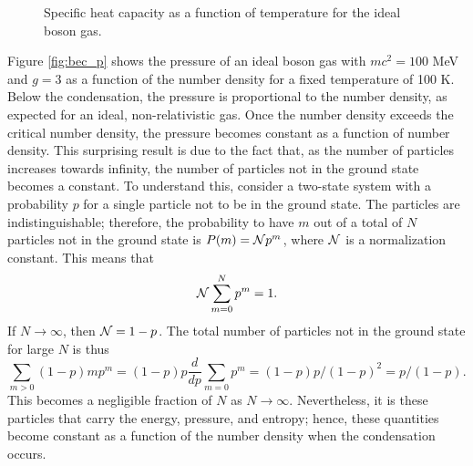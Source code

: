 \documentclass[pdftex]{article}    %
\begin{document}
\begin{figure}[htp]
\centering
{}
\caption{
Specific heat capacity as a function of temperature for the ideal boson
gas.
}
\label{fig:cv}
\end{figure}

Figure \ref{fig:bec_p} shows the pressure of an ideal boson gas with
$mc^2 = 100$ MeV and $g = 3$ as a function of the number density for a
fixed temperature of 100 K.  Below the condensation, the pressure is
proportional to the number density, as expected for an ideal, non-relativistic
gas.  Once the number density exceeds the critical number density,
the pressure becomes constant as a function of number density.  This
surprising result is due to the fact that, as the number of particles
increases towards infinity, the number of particles not in the ground
state becomes a constant.  To understand this, consider a two-state system
with a probability $p$ for a single particle not to be in the ground state.
The particles are indistinguishable; therefore, the probability to have $m$ out of a
total of $N$ particles not in the ground state is $P(m) = {\cal N} p^m$,
where ${\cal N}$ is a normalization constant.  This means
that
\[
{\cal N} \sum_{m=0}^N p^m = 1.
\]
If $N \to \infty$, then ${\cal N} = 1 - p$.  The total number of particles not
in the ground state for large $N$ is thus
\[
\sum_{m>0} (1 - p) m p^m = (1 - p) p \frac{d}{dp} \sum_{m=0} p^m = (1 - p) p / (1 - p)^2 = p / (1 - p).
\]
This becomes a negligible fraction of $N$ as $N \to \infty$.  Nevertheless,
it is these particles that carry the energy, pressure,
and entropy; hence, these quantities become constant as a function of
the number density when the condensation occurs.
\end{document}
